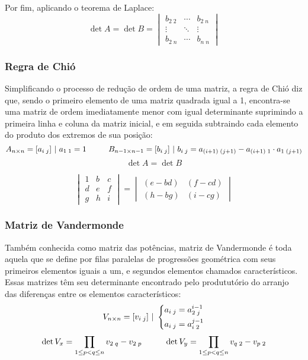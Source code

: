         Por fim, aplicando o teorema de Laplace:
        \[ \det{A} = \det{B} = \begin{vmatrix} b_{2 \; 2} & \cdots & b_{2 \; n} \\ \vdots & \ddots & \vdots \\ b_{2 \; n} & \cdots & b_{n \; n} \end{vmatrix} \]
    \subsubsection{Regra de Chió}
        Simplificando o processo de redução de ordem de uma matriz, a regra de Chió diz que, sendo o primeiro elemento de uma matriz quadrada igual a 1, encontra-se uma matriz de ordem imediatamente menor com igual determinante suprimindo a primeira linha e coluna da matriz inicial, e em seguida subtraindo cada elemento do produto dos extremos de sua posição:
        \[ A_{n \times n} = [a_{i \; j}] \ | \ a_{1 \; 1} = 1 \hphantom{---} B_{n-1 \times n-1} = [b_{i \; j}] \ | \ b_{i \; j} = a_{(i+1) \; (j+1)} - a_{(i+1) \; 1} \cdot a_{1 \; (j+1)} \]
        \[ \det{A} = \det{B} \]
        
        \eg
        \[ \begin{vmatrix} 1 & b & c \\ d & e & f \\ g & h & i \end{vmatrix} = \begin{vmatrix} (e - bd) & (f-cd) \\ (h -bg) & (i -cg) \end{vmatrix} \]
    \subsubsection{Matriz de Vandermonde}
        Também conhecida como matriz das potências, matriz de Vandermonde é toda aquela que se define por filas paralelas de progressões geométrica com seus primeiros elementos iguais a um, e segundos elementos chamados característicos. Essas matrizes têm seu determinante encontrado pelo prodututório do arranjo das diferenças entre os elementos característicos:
        \[ V_{n \times n} = [v_{i \; j}] \ | \ \begin{dcases} a_{i \; j} = a_{2 \; j}^{i-1} \\ a_{i \; j} = a_{i \; 2}^{j-1} \end{dcases} \]
        \[ \det{V_x} = \displaystyle\prod_{1 \leq p < q \leq n} {v_{2 \; q} - v_{2 \; p}} \hphantom{---} \det{V_y} = \displaystyle\prod_{1 \leq p < q \leq n} {v_{q \; 2} - v_{p \; 2}} \]

